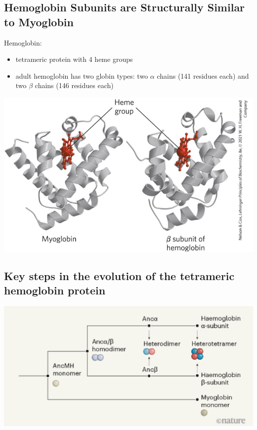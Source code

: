 \documentclass[10pt]{article}
\begin{document}
\subsection*{Hemoglobin Subunits are Structurally Similar to Myoglobin}
Hemoglobin:
\begin{itemize}
    \item tetrameric protein with 4 heme groups
    \item adult hemoglobin has two globin types: two $\alpha$ chains (141 residues each) and two $\beta$ chains (146 residues each)
\end{itemize}
\begin{center}
    \includegraphics*[scale=0.7]{L3_2.png}
\end{center}

\subsection*{Key steps in the evolution of the tetrameric hemoglobin protein}
\begin{center}
    \includegraphics*[width=\textwidth]{L3_3.png}
\end{center}
\end{document}
